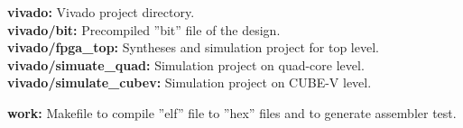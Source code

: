 \textbf{vivado:}		Vivado project directory.\\
\textbf{vivado/bit:}		Precompiled ''bit'' file of the design.\\
\textbf{vivado/fpga\_top:} Syntheses and simulation project for top level.\\
\textbf{vivado/simuate\_quad:} Simulation project on quad-core level.\\
\textbf{vivado/simulate\_cubev:} Simulation project on CUBE-V level.

\textbf{work:} 		Makefile to compile ''elf'' file to ''hex'' files and to generate assembler test.

